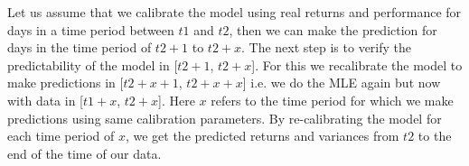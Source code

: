 Let us assume that we calibrate the model using real returns and performance for days in a time period between $t1$ and $t2$, then we can make the prediction for days in the time period of $t2+1$ to $t2+x$. The next step is to verify the predictability of the model in [$t2+1$, $t2+x$]. For this we recalibrate the model to make predictions in [$t2+x+1$, $t2+x+x$] i.e. we do the MLE again but now with data in [$t1+x$, $t2+x$]. Here $x$ refers to the time period for which we make predictions using same calibration parameters. By re-calibrating the model for each time period of $x$, we get the predicted returns and variances from $t2$ to the end of the time of our data.